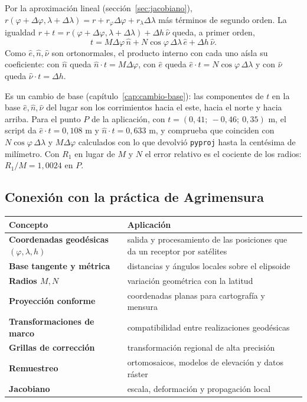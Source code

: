 \begin{demostracion}
Por la aproximación lineal (sección~\ref{sec:jacobiano}),
\(r(\varphi+\Delta\varphi,\lambda+\Delta\lambda)=r+r_\varphi\Delta\varphi+r_\lambda\Delta\lambda\)
más términos de segundo orden. La igualdad \(r+t=r(\varphi+\Delta\varphi,\lambda+\Delta\lambda)+\Delta h\,\hat\nu\)
queda, a primer orden,
\[
t=M\Delta\varphi\,\hat n+N\cos\varphi\,\Delta\lambda\,\hat e+\Delta h\,\hat\nu .
\]
Como \(\hat e,\hat n,\hat\nu\) son ortonormales, el producto interno con cada uno aísla su
coeficiente: con \(\hat n\) queda \(\hat n\cdot t=M\Delta\varphi\), con \(\hat e\) queda
\(\hat e\cdot t=N\cos\varphi\,\Delta\lambda\) y con \(\hat\nu\) queda \(\hat\nu\cdot t=\Delta h\).
\end{demostracion}

Es un cambio de base (capítulo~\ref{cap:cambio-base}): las componentes de \(t\) en la base
\(\hat e,\hat n,\hat\nu\) del lugar son los corrimientos hacia el este, hacia el norte y hacia
arriba. Para el punto \(P\) de la aplicación, con \(t=(0{,}41;\ -0{,}46;\ 0{,}35)\) m, el
script da \(\hat e\cdot t=0{,}108\) m y \(\hat n\cdot t=0{,}633\) m, y comprueba que coinciden
con \(N\cos\varphi\,\Delta\lambda\) y \(M\Delta\varphi\) calculados con lo que devolvió
\texttt{pyproj} hasta la centésima de milímetro. Con \(R_1\) en lugar de \(M\) y \(N\) el
error relativo es el cociente de los radios: \(R_1/M=1{,}0024\) en \(P\).

\subsection{Conexión con la práctica de Agrimensura}

\begin{center}
\begin{tabularx}{\textwidth}{>{\bfseries}p{47mm} X}
\toprule
Concepto & Aplicación\\
\midrule
Coordenadas geodésicas \((\varphi,\lambda,h)\) & salida y procesamiento de las posiciones que da un receptor por satélites\\
Base tangente y métrica & distancias y ángulos locales sobre el elipsoide\\
Radios \(M,N\) & variación geométrica con la latitud\\
Proyección conforme & coordenadas planas para cartografía y mensura\\
Transformaciones de marco & compatibilidad entre realizaciones geodésicas\\
Grillas de corrección & transformación regional de alta precisión\\
Remuestreo & ortomosaicos, modelos de elevación y datos ráster\\
Jacobiano & escala, deformación y propagación local\\
\bottomrule
\end{tabularx}
\end{center}

